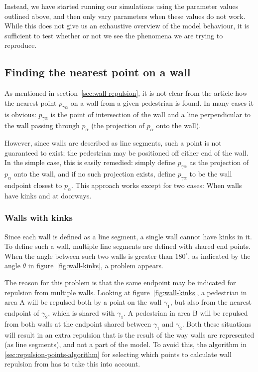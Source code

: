 Instead, we have started running our simulations using the parameter values 
outlined above, and then only vary parameters when these values do not work. 
While this does not give us an exhaustive overview of the model behaviour, it 
is sufficient to test whether or not we see the phenomena we are trying to 
reproduce.

\subsection{Finding the nearest point on a wall}
\label{sec:repulsion-points}
As mentioned in section~\ref{sec:wall-repulsion}, it is not clear from the 
article how the nearest point $p_{\gamma \alpha}$ on a wall from a given 
pedestrian is found. In many cases it is obvious: $p_{\gamma \alpha}$ is the 
point of intersection of the wall and a line perpendicular to the wall passing 
through $p_\alpha$ (the projection of $p_\alpha$ onto the wall).

However, since walls are described as line segments, such a point is not 
guaranteed to exist; the pedestrian may be positioned off either end of the 
wall. In the simple case, this is easily remedied: simply define $p_{\gamma 
\alpha}$ as the projection of $p_\alpha$ onto the wall, and if no such 
projection exists, define $p_{\gamma \alpha}$ to be the wall endpoint closest 
to $p_\alpha$. This approach works except for two cases: When walls have kinks 
and at doorways.

\subsubsection{Walls with kinks}
Since each wall is defined as a line segment, a single wall cannot have kinks 
in it. To define such a wall, multiple line segments are defined with shared 
end points. When the angle between such two walls is greater than $180^\circ$, 
as indicated by the angle $\theta$ in figure~\ref{fig:wall-kinks}, a 
problem appears.

The reason for this problem is that the same endpoint may be indicated for 
repulsion from multiple walls. Looking at figure~\ref{fig:wall-kinks}, a 
pedestrian in area A will be repulsed both by a point on the wall $\gamma_1$, 
but also from the nearest endpoint of $\gamma_2$, which is shared with 
$\gamma_1$. A pedestrian in area B will be repulsed from both walls at the 
endpoint shared between $\gamma_1$ and $\gamma_2$. Both these situations will 
result in an extra repulsion that is the result of the way walls are 
represented (as line segments), and not a part of the model. To avoid this, 
the algorithm in \ref{sec:repulsion-points-algorithm} for selecting which points 
to calculate wall repulsion from has to take this into account.


